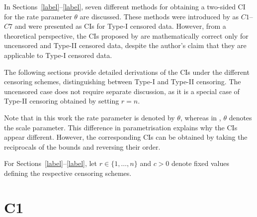 In Sections~\ref{label}--\ref{label}, seven different methods for obtaining a two-sided CI for the rate parameter $\theta$ are discussed. These methods were introduced by \cite{Sundberg2001} as $C1$--$C7$ and were presented as CIs for Type-I censored data. However, from a theoretical perspective, the CIs proposed by \cite{Sundberg2001} are mathematically correct only for uncensored and Type-II censored data, despite the author's claim that they are applicable to Type-I censored data.

The following sections provide detailed derivations of the CIs under the different censoring schemes, distinguishing between Type-I and Type-II censoring. The uncensored case does not require separate discussion, as it is a special case of Type-II censoring obtained by setting $r=n$.

Note that in this work the rate parameter is denoted by $\theta$, whereas in \cite{Sundberg2001}, $\theta$ denotes the scale parameter. This difference in parametrisation explains why the CIs appear different. However, the corresponding CIs can be obtained by taking the reciprocals of the bounds and reversing their order.

For Sections~\ref{label}--\ref{label}, let $r \in \{1,\ldots,n\}$ and $c>0$ denote fixed values defining the respective censoring schemes.


\section{C1}

